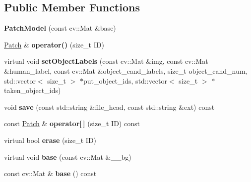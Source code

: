 \subsection*{Public Member Functions}
\begin{DoxyCompactItemize}
\item 
\hypertarget{classskl_1_1_patch_model_aeac5af0362e5aa9a17b5032cd5787e38}{}\label{classskl_1_1_patch_model_aeac5af0362e5aa9a17b5032cd5787e38} 
{\bfseries Patch\+Model} (const cv\+::\+Mat \&base)
\item 
\hypertarget{classskl_1_1_patch_model_ab7b1f4e65e3fbc4a8d09a0c66bca618c}{}\label{classskl_1_1_patch_model_ab7b1f4e65e3fbc4a8d09a0c66bca618c} 
\hyperlink{classskl_1_1_patch}{Patch} \& {\bfseries operator()} (size\+\_\+t ID)
\item 
\hypertarget{classskl_1_1_patch_model_a044c551eabb11a2ebd1da0b8c85453d4}{}\label{classskl_1_1_patch_model_a044c551eabb11a2ebd1da0b8c85453d4} 
virtual void {\bfseries set\+Object\+Labels} (const cv\+::\+Mat \&img, const cv\+::\+Mat \&human\+\_\+label, const cv\+::\+Mat \&object\+\_\+cand\+\_\+labels, size\+\_\+t object\+\_\+cand\+\_\+num, std\+::vector$<$ size\+\_\+t $>$ $\ast$put\+\_\+object\+\_\+ids, std\+::vector$<$ size\+\_\+t $>$ $\ast$taken\+\_\+object\+\_\+ids)
\item 
\hypertarget{classskl_1_1_patch_model_a8b8e67814d07d164a8001c2d7182159f}{}\label{classskl_1_1_patch_model_a8b8e67814d07d164a8001c2d7182159f} 
void {\bfseries save} (const std\+::string \&file\+\_\+head, const std\+::string \&ext) const
\item 
\hypertarget{classskl_1_1_patch_model_a8dd4f665030782c88e1c43e1791db427}{}\label{classskl_1_1_patch_model_a8dd4f665030782c88e1c43e1791db427} 
const \hyperlink{classskl_1_1_patch}{Patch} \& {\bfseries operator\mbox{[}$\,$\mbox{]}} (size\+\_\+t ID) const
\item 
\hypertarget{classskl_1_1_patch_model_a28fd67d405a7bba59663cfdae1a0a6cb}{}\label{classskl_1_1_patch_model_a28fd67d405a7bba59663cfdae1a0a6cb} 
virtual bool {\bfseries erase} (size\+\_\+t ID)
\item 
\hypertarget{classskl_1_1_patch_model_a92ec1672e24adbb28b9ac30bed4cde59}{}\label{classskl_1_1_patch_model_a92ec1672e24adbb28b9ac30bed4cde59} 
virtual void {\bfseries base} (const cv\+::\+Mat \&\+\_\+\+\_\+bg)
\item 
\hypertarget{classskl_1_1_patch_model_a698cd109a2a2ebc425e62017afcc48ae}{}\label{classskl_1_1_patch_model_a698cd109a2a2ebc425e62017afcc48ae} 
const cv\+::\+Mat \& {\bfseries base} () const

\end{DoxyCompactItemize}

